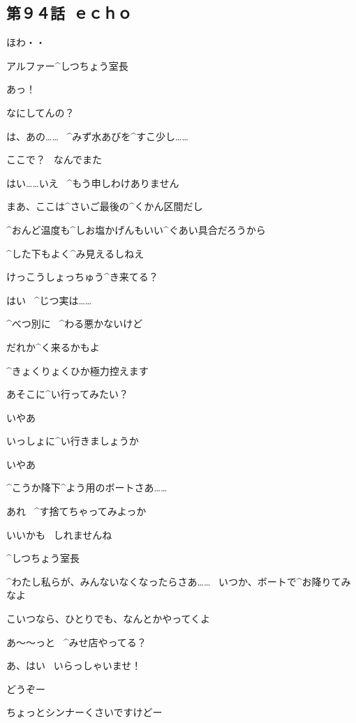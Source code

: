 \subsection{第９４話\ ｅｃｈｏ}

\page[89]
\Alpha ほわ・・

\page[95]
\Person アルファー^{しつちょう}{室長}

\ASevenMOne あっ！

\Person なにしてんの？

\ASevenMOne は、あの……
\ ^{みず}{水}あびを^{すこ}{少}し……

\Person ここで？
\ なんでまた

\ASevenMOne はい……いえ
\ ^{もう}{申}しわけありません

\page
\Person まあ、ここは^{さいご}{最後}の^{くかん}{区間}だし

\Person ^{おんど}{温度}も^{しお}{塩}かげんもいい^{ぐあい}{具合}だろうから

\Person ^{した}{下}もよく^{み}{見}えるしねえ

\Person けっこうしょっちゅう^{き}{来}てる？

\ASevenMOne はい
\ ^{じつ}{実}は……

\Person ^{べつ}{別}に
\ ^{わる}{悪}かないけど

\Person だれか^{く}{来}るかもよ

\ASevenMOne ^{きょくりょくひか}{極力控}えます

\page
\Person あそこに^{い}{行}ってみたい？

\ASevenMOne いやあ

\ASevenMOne いっしょに^{い}{行}きましょうか

\Person いやあ

\page
\Person ^{こうか}{降下}^{よう}{用}のボートさあ……

\Person あれ
\ ^{す}{捨}てちゃってみよっか

\ASevenMOne いいかも
\ しれませんね

\page
\Person ^{しつちょう}{室長}

\Person ^{わたし}{私}らが、みんないなくなったらさあ……
\ いつか、ボートで^{お}{降}りてみなよ

\Person こいつなら、ひとりでも、なんとかやってくよ

\page[102]
\Person あ〜〜っと
\ ^{みせ}{店}やってる？

\Alpha あ、はい
\ いらっしゃいませ！

\Alpha どうぞー

\Alpha ちょっとシンナーくさいですけどー


